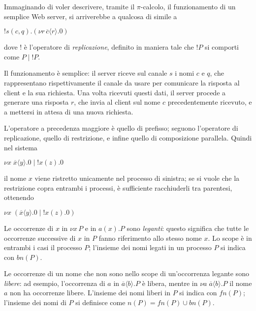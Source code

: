 Immaginando di voler descrivere, tramite il $\pi$-calcolo, il funzionamento
di un semplice Web server, si arriverebbe a qualcosa di simile a

\begin{pilisting}
$
    !s(c,q).(\nu r \, \overline{c}\langle r\rangle.0)
$
\end{pilisting}

dove $!$ \`e l'operatore di \emph{replicazione}, definito in maniera tale
che $!P$ si comporti come $P \; | \; !P$.

Il funzionamento \`e semplice: il server riceve sul canale $s$ i nomi $c$ e
$q$, che rappresentano rispettivamente il canale da usare per comunicare la
risposta al client e la sua richiesta. Una volta ricevuti questi dati, il
server procede a generare una risposta $r$, che invia al client sul nome $c$
precedentemente ricevuto, e a mettersi in attesa di una nuova richiesta.

L'operatore a precedenza maggiore \`e quello di prefisso; seguono
l'operatore di replicazione, quello di restrizione, e infine quello di
composizione parallela. Quindi nel sistema

\begin{pilisting}
$
    \nu x\; \overline{x}\langle y\rangle.0 \; | \;
    !x(z).0
$
\end{pilisting}

il nome $x$ viene ristretto unicamente nel processo di sinistra; se si
vuole che la restrizione copra entrambi i processi, \`e sufficiente
racchiuderli tra parentesi, ottenendo

\begin{pilisting}
$
    \nu x\; (\overline{x}\langle y\rangle.0 \; | \;
    !x(z).0)
$
\end{pilisting}

Le occorrenze di $x$ in $\nu x \, P$ e in $ a(x).P$ sono \emph{leganti}:
questo significa che tutte le occorrenze successive di $x$ in $P$ fanno
riferimento allo stesso nome $x$. Lo scope \`e in entrambi i casi il
processo $P$; l'insieme dei nomi legati in un processo $P$ si indica con
$bn(P)$.

Le occorrenze di un nome che non sono nello scope di un'occorrenza legante
sono \emph{libere}: ad esempio, l'occorrenza di $a$ in
$\overline{a}\langle b\rangle.P$ \`e libera, mentre in
$\nu a \; \overline{a}\langle b\rangle.P$ il nome $a$ non ha occorrenze
libere. L'insieme dei nomi liberi in $P$ si indica con $fn(P)$; l'insieme
dei nomi di $P$ si definisce come $n(P) = fn(P) \cup bn(P)$.


